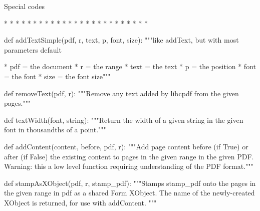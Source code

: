     Special codes

      * %
      * %
      * %
      * %
      * %
      * %
      * %
      * %
      * %
      * %
      * %
      * %
      * %
      * %
      * %
      * %
      * %
      * %
      * %
      * %
      * %
      * %
      * %
      * %
      * %

def addTextSimple(pdf, r, text, p, font, size):
    """like addText, but with most parameters default

         * pdf = the document
         * r = the range
         * text = the text
         * p = the position
         * font = the font
         * size = the font size"""

def removeText(pdf, r):
    """Remove any text added by libcpdf from the given pages."""

def textWidth(font, string):
    """Return the width of a given string in the given font in thousandths of a
    point."""

def addContent(content, before, pdf, r):
    """Add page content before (if True) or after (if False) the existing
    content to pages in the given range in the given PDF. Warning: this a low
    level function requiring understanding of the PDF format."""

def stampAsXObject(pdf, r, stamp_pdf):
    """Stamps stamp_pdf onto the pages in the given range in pdf as a shared
    Form XObject. The name of the newly-created XObject is returned, for use
    with addContent. """
